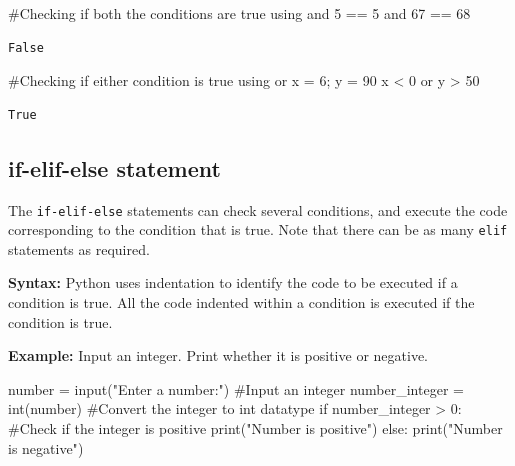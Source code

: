 \documentclass[
  letterpaper,
  DIV=11,
  numbers=noendperiod]{scrreprt}
\newenvironment{Shaded}{\begin{snugshade}}{\end{snugshade}}
\newcommand{\BuiltInTok}[1]{\textcolor[rgb]{0.00,0.23,0.31}{#1}}
\newcommand{\CommentTok}[1]{\textcolor[rgb]{0.37,0.37,0.37}{#1}}
\newcommand{\ControlFlowTok}[1]{\textcolor[rgb]{0.00,0.23,0.31}{#1}}
\newcommand{\DecValTok}[1]{\textcolor[rgb]{0.68,0.00,0.00}{#1}}
\newcommand{\KeywordTok}[1]{\textcolor[rgb]{0.00,0.23,0.31}{#1}}
\newcommand{\NormalTok}[1]{\textcolor[rgb]{0.00,0.23,0.31}{#1}}
\newcommand{\OperatorTok}[1]{\textcolor[rgb]{0.37,0.37,0.37}{#1}}
\newcommand{\StringTok}[1]{\textcolor[rgb]{0.13,0.47,0.30}{#1}}
\begin{document}
\begin{Shaded}
\begin{Highlighting}[]
\CommentTok{\#Checking if both the conditions are true using \textquotesingle{}and\textquotesingle{}}
\DecValTok{5} \OperatorTok{==} \DecValTok{5} \KeywordTok{and} \DecValTok{67} \OperatorTok{==} \DecValTok{68}
\end{Highlighting}
\end{Shaded}

\begin{verbatim}
False
\end{verbatim}

\begin{Shaded}
\begin{Highlighting}[]
\CommentTok{\#Checking if either condition is true using \textquotesingle{}or\textquotesingle{}}
\NormalTok{x }\OperatorTok{=} \DecValTok{6}\OperatorTok{;}\NormalTok{ y }\OperatorTok{=} \DecValTok{90}
\NormalTok{x }\OperatorTok{\textless{}} \DecValTok{0} \KeywordTok{or}\NormalTok{ y }\OperatorTok{\textgreater{}} \DecValTok{50}
\end{Highlighting}
\end{Shaded}

\begin{verbatim}
True
\end{verbatim}

\hypertarget{if-elif-else-statement}{%
\subsection{if-elif-else statement}\label{if-elif-else-statement}}

The \texttt{if-elif-else} statements can check several conditions, and
execute the code corresponding to the condition that is true. Note that
there can be as many \texttt{elif} statements as required.

\textbf{Syntax:} Python uses indentation to identify the code to be
executed if a condition is true. All the code indented within a
condition is executed if the condition is true.

\textbf{Example:} Input an integer. Print whether it is positive or
negative.

\begin{Shaded}
\begin{Highlighting}[]
\NormalTok{number }\OperatorTok{=} \BuiltInTok{input}\NormalTok{(}\StringTok{"Enter a number:"}\NormalTok{)  }\CommentTok{\#Input an integer}
\NormalTok{number\_integer }\OperatorTok{=} \BuiltInTok{int}\NormalTok{(number)       }\CommentTok{\#Convert the integer to \textquotesingle{}int\textquotesingle{} datatype}
\ControlFlowTok{if}\NormalTok{ number\_integer }\OperatorTok{\textgreater{}} \DecValTok{0}\NormalTok{:               }\CommentTok{\#Check if the integer is positive}
    \BuiltInTok{print}\NormalTok{(}\StringTok{"Number is positive"}\NormalTok{)}
\ControlFlowTok{else}\NormalTok{:}
    \BuiltInTok{print}\NormalTok{(}\StringTok{"Number is negative"}\NormalTok{)}
\end{Highlighting}
\end{Shaded}
\end{document}
